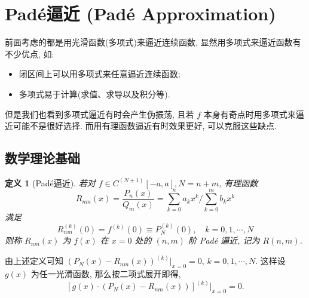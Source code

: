 \documentclass[UTF8, a4paper, 11pt]{ctexart}
\newtheorem{definition}{定义}[section]
\begin{document}
\section{Padé逼近 (Padé Approximation)}
前面考虑的都是用光滑函数(多项式)来逼近连续函数, 显然用多项式来逼近函数有不少优点, 如: 
\begin{itemize}
    \item[1.] 闭区间上可以用多项式来任意逼近连续函数; 
    \item[2.] 多项式易于计算(求值、求导以及积分等). 
\end{itemize}
但是我们也看到多项式逼近有时会产生伪振荡, 且若 $ f $ 本身有奇点时用多项式来逼近可能不是很好选择. 而用有理函数逼近有时效果更好, 可以克服这些缺点. 
\subsection{数学理论基础}
\begin{definition}[Pad\'e逼近]
    若对 $ f \in C^{(N+1)}[-a, a], N = n + m $, 有理函数
    \[ R_{nm}(x) = \frac{P_n(x)}{Q_m(x)} = \sum_{k=0}^{n} a_k x^k / \sum_{k=0}^{m} b_k x^k \]
    满足
    \[ R_{nm}^{(k)}(0) = f^{(k)}(0) \equiv P_N^{(k)}(0), \quad k = 0, 1, \cdots, N \]
    则称 $ R_{nm}(x) $ 为 $ f(x) $ 在 $ x = 0 $ 处的 $ (n, m) $ 阶 Pad\'e 逼近, 记为 $ R(n, m) $. 
\end{definition}
由上述定义可知 $ \left( P_N(x) - R_{nm}(x) \right)^{(k)} \big|_{x=0} = 0, \, k = 0, 1, \cdots, N $. 
这样设 $ g(x) $ 为任一光滑函数, 那么按二项式展开即得, 
\[ \left[ g(x) \cdot \left( P_N(x) - R_{nm}(x) \right) \right]^{(k)} \big|_{x=0} = 0. \]
\end{document}
